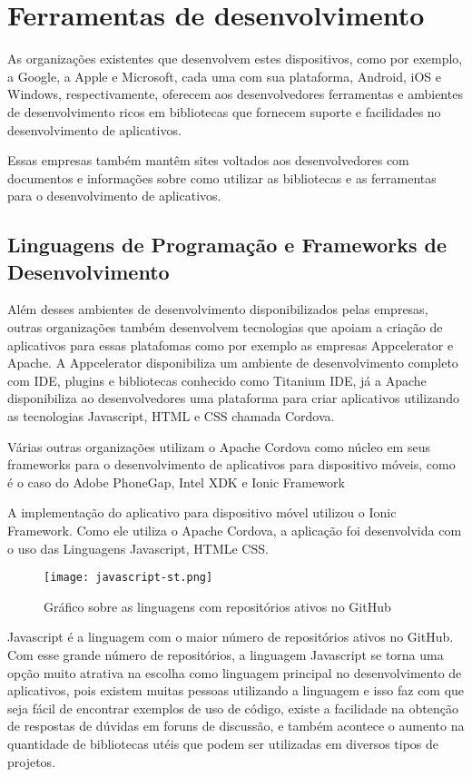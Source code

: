 \chapter{Ferramentas de desenvolvimento}
As organizações existentes que desenvolvem estes dispositivos, como por exemplo, a Google, a Apple e Microsoft, cada uma com sua plataforma, Android, iOS e Windows, respectivamente, oferecem aos desenvolvedores ferramentas e ambientes de desenvolvimento ricos em bibliotecas que fornecem suporte e facilidades no desenvolvimento de aplicativos.

Essas empresas também mantêm sites voltados aos desenvolvedores com documentos e informações sobre como utilizar as bibliotecas e as ferramentas para o desenvolvimento de aplicativos.

\section{Linguagens de Programação e Frameworks de Desenvolvimento}
Além desses ambientes de desenvolvimento disponibilizados pelas empresas, outras organizações também desenvolvem tecnologias que apoiam a criação de aplicativos para essas platafomas como por exemplo as empresas Appcelerator e Apache. A Appcelerator disponibiliza um ambiente de desenvolvimento completo com IDE, plugins e bibliotecas conhecido como Titanium IDE, já a Apache disponibiliza ao desenvolvedores uma plataforma para criar aplicativos utilizando as tecnologias Javascript, HTML e CSS chamada Cordova.

Várias outras organizações utilizam o Apache Cordova como núcleo em seus frameworks para o desenvolvimento de aplicativos para dispositivo móveis, como é o caso do Adobe PhoneGap, Intel XDK e Ionic Framework

A implementação do aplicativo para dispositivo móvel utilizou o Ionic Framework. Como ele utiliza o Apache Cordova, a aplicação foi desenvolvida com o uso das Linguagens Javascript, HTMLe CSS.

\begin{figure}[!htb]
	\centering
	\texttt{[image: javascript-st.png]} %
	\caption[Linguagens com maior número de repositórios ativos no GitHub]{Gráfico sobre as linguagens com repositórios ativos no GitHub}
	\label{fig:javascript}
\end{figure}

Javascript é a linguagem com o maior número de repositórios ativos no GitHub. Com esse grande número de repositórios, a linguagem Javascript se torna uma opção muito atrativa na escolha como linguagem principal no desenvolvimento de aplicativos, pois existem muitas pessoas utilizando a linguagem e isso faz com que seja fácil de encontrar exemplos de uso de código, existe a facilidade na obtenção de respostas de dúvidas em foruns de discussão, e também acontece o aumento na quantidade de bibliotecas utéis que podem ser utilizadas em diversos tipos de projetos.

